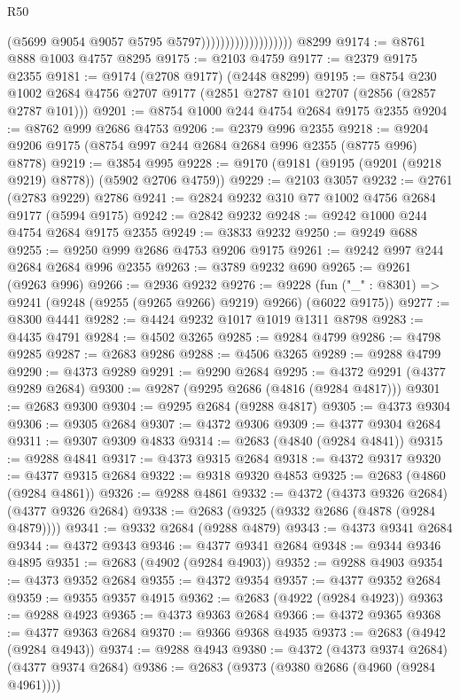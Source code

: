 \begin{lexlean}{R50}
\begin{coremodule}
                                        (@5699 @9054 @9057 @5795 @5797)))))))))))))))))))
    @8299
@9174 := @8761 @888 @1003 @4757 @8295
@9175 := @2103 @4759
@9177 := @2379 @9175 @2355
@9181 := @9174 (@2708 @9177) (@2448 @8299)
@9195 := @8754
    @230
    @1002
    @2684
    @4756
    @2707
    @9177
    (@2851 @2787 @101 @2707 (@2856 (@2857 @2787 @101)))
@9201 := @8754 @1000 @244 @4754 @2684 @9175 @2355
@9204 := @8762 @999 @2686 @4753
@9206 := @2379 @996 @2355
@9218 := @9204 @9206 @9175 (@8754 @997 @244 @2684 @2684 @996 @2355 (@8775 @996) @8778)
@9219 := @3854 @995
@9228 := @9170 (@9181 (@9195 (@9201 (@9218 @9219) @8778)) (@5902 @2706 @4759))
@9229 := @2103 @3057
@9232 := @2761 (@2783 @9229) @2786
@9241 := @2824 @9232 @310 @77 @1002 @4756 @2684 @9177 (@5994 @9175)
@9242 := @2842 @9232
@9248 := @9242 @1000 @244 @4754 @2684 @9175 @2355
@9249 := @3833 @9232
@9250 := @9249 @688
@9255 := @9250 @999 @2686 @4753 @9206 @9175
@9261 := @9242 @997 @244 @2684 @2684 @996 @2355
@9263 := @3789 @9232 @690
@9265 := @9261 (@9263 @996)
@9266 := @2936 @9232
@9276 := @9228 (fun ("_" : @8301) => @9241 (@9248 (@9255 (@9265 @9266) @9219) @9266) (@6022 @9175))
@9277 := @8300 @4441
@9282 := @4424 @9232 @1017 @1019 @1311 @8798
@9283 := @4435 @4791
@9284 := @4502 @3265
@9285 := @9284 @4799
@9286 := @4798 @9285
@9287 := @2683 @9286
@9288 := @4506 @3265
@9289 := @9288 @4799
@9290 := @4373 @9289
@9291 := @9290 @2684
@9295 := @4372 @9291 (@4377 @9289 @2684)
@9300 := @9287 (@9295 @2686 (@4816 (@9284 @4817)))
@9301 := @2683 @9300
@9304 := @9295 @2684 (@9288 @4817)
@9305 := @4373 @9304
@9306 := @9305 @2684
@9307 := @4372 @9306
@9309 := @4377 @9304 @2684
@9311 := @9307 @9309 @4833
@9314 := @2683 (@4840 (@9284 @4841))
@9315 := @9288 @4841
@9317 := @4373 @9315 @2684
@9318 := @4372 @9317
@9320 := @4377 @9315 @2684
@9322 := @9318 @9320 @4853
@9325 := @2683 (@4860 (@9284 @4861))
@9326 := @9288 @4861
@9332 := @4372 (@4373 @9326 @2684) (@4377 @9326 @2684)
@9338 := @2683 (@9325 (@9332 @2686 (@4878 (@9284 @4879))))
@9341 := @9332 @2684 (@9288 @4879)
@9343 := @4373 @9341 @2684
@9344 := @4372 @9343
@9346 := @4377 @9341 @2684
@9348 := @9344 @9346 @4895
@9351 := @2683 (@4902 (@9284 @4903))
@9352 := @9288 @4903
@9354 := @4373 @9352 @2684
@9355 := @4372 @9354
@9357 := @4377 @9352 @2684
@9359 := @9355 @9357 @4915
@9362 := @2683 (@4922 (@9284 @4923))
@9363 := @9288 @4923
@9365 := @4373 @9363 @2684
@9366 := @4372 @9365
@9368 := @4377 @9363 @2684
@9370 := @9366 @9368 @4935
@9373 := @2683 (@4942 (@9284 @4943))
@9374 := @9288 @4943
@9380 := @4372 (@4373 @9374 @2684) (@4377 @9374 @2684)
@9386 := @2683 (@9373 (@9380 @2686 (@4960 (@9284 @4961))))

\end{coremodule}
\end{lexlean}
